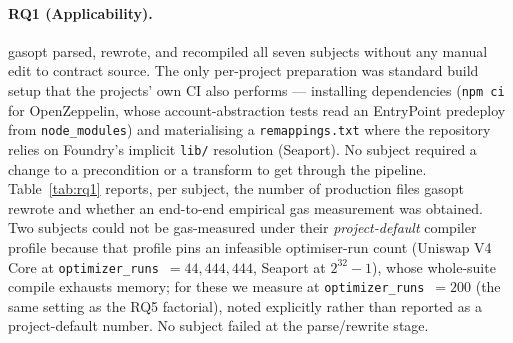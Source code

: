 

\paragraph{RQ1 (Applicability).}
gasopt parsed, rewrote, and recompiled all seven subjects without any manual edit to
contract source. The only per-project preparation was standard build setup that the
projects' own CI also performs --- installing dependencies (\texttt{npm ci} for
OpenZeppelin, whose account-abstraction tests read an EntryPoint predeploy from
\texttt{node\_modules}) and materialising a \texttt{remappings.txt} where the repository
relies on Foundry's implicit \texttt{lib/} resolution (Seaport). No subject required a
change to a precondition or a transform to get through the pipeline. Table~\ref{tab:rq1}
reports, per subject, the number of production files gasopt rewrote and whether an
end-to-end empirical gas measurement was obtained. Two subjects could not be gas-measured
under their \emph{project-default} compiler profile because that profile pins an infeasible
optimiser-run count (Uniswap V4 Core at \texttt{optimizer\_runs}~$=44{,}444{,}444$, Seaport
at $2^{32}-1$), whose whole-suite compile exhausts memory; for these we measure at
\texttt{optimizer\_runs}~$=200$ (the same setting as the RQ5 factorial), noted explicitly
rather than reported as a project-default number. No subject failed at the parse/rewrite
stage.

